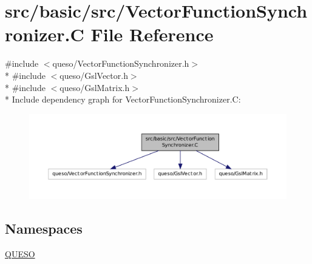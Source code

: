 \hypertarget{_vector_function_synchronizer_8_c}{\section{src/basic/src/\-Vector\-Function\-Synchronizer.C File Reference}
\label{_vector_function_synchronizer_8_c}
}
{\ttfamily \#include $<$queso/\-Vector\-Function\-Synchronizer.\-h$>$}\\*
{\ttfamily \#include $<$queso/\-Gsl\-Vector.\-h$>$}\\*
{\ttfamily \#include $<$queso/\-Gsl\-Matrix.\-h$>$}\\*
Include dependency graph for Vector\-Function\-Synchronizer.\-C\-:
\nopagebreak
\begin{figure}[H]
\begin{center}
\leavevmode
\includegraphics[width=350pt]{_vector_function_synchronizer_8_c__incl}
\end{center}
\end{figure}
\subsection*{Namespaces}
\begin{DoxyCompactItemize}
\item 
\hyperlink{namespace_q_u_e_s_o}{Q\-U\-E\-S\-O}
\end{DoxyCompactItemize}
